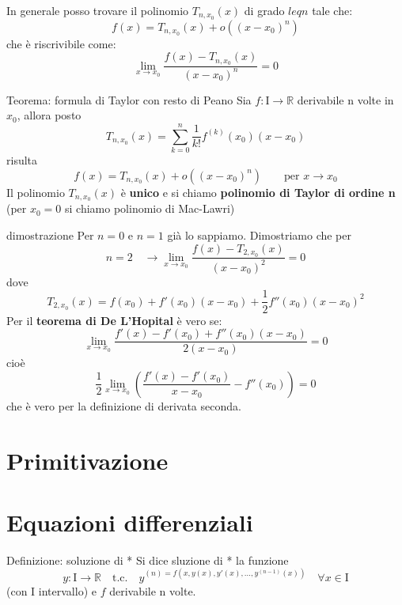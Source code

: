 \documentclass[x11names]{article}
\begin{document}
	In generale posso trovare il polinomio $T_{n,x_0}(x)$ di grado $leq n$ tale che:
	\[
	f(x) = T_{n,x_0}(x) + o\left( (x-x_0)^n\right)
	\]
	che è riscrivibile come:
	\[
	\lim_{x\to x_0}\frac{f(x) - T_{n,x_0}(x)}{(x-x_0)^n} = 0
	\]
	\begin{center}
		\colorbox{myred}{\begin{minipage}{5.75in}
				\begin{redes}{Teorema: formula di Taylor con resto di Peano}
					Sia $f:$I$\to \mathbb{R}$ derivabile n volte in $x_0$, allora posto
					\[
					T_{n,x_0}(x) = \sum_{k=0}^{n}\frac{1}{k!}f^{(k)}(x_0)(x-x_0)
					\]
					risulta
					\[
					f(x) = T_{n,x_0}(x) + o\left( (x-x_0)^n\right) \qquad \text{per }x \to x_0
					\]
					Il polinomio $T_{n,x_0}(x)$ è \textbf{unico} e si chiamo \textbf{polinomio di Taylor di ordine n} (per $x_0 = 0$ si chiamo polinomio di Mac-Lawri)
				\end{redes} 
		\end{minipage}}        
	\end{center}
	\begin{es}{dimostrazione}
		Per $n=0$ e $n=1$ già lo sappiamo. Dimostriamo che per 
		\[
		n = 2 \quad \to \lim_{x\to x_0}\frac{f(x) - T_{2,x_0}(x)}{(x-x_0)^2} = 0
		\]
		dove
		\[
		T_{2,x_0}(x) = f(x_0) + f'(x_0)(x-x_0) + \frac{1}{2}f''(x_0)(x-x_0)^2
		\]
		Per il \textbf{teorema di De L'Hopital} è vero se:
		\[
		\lim_{x\to x_0}\frac{f'(x) - f'(x_0)+f''(x_0)(x-x_0)}{2(x-x_0)} = 0
		\]
		cioè
		\[
		\frac{1}{2}\lim_{x\to x_0}\left( \frac{f'(x) - f'(x_0)}{x-x_0} - f''(x_0)\right) = 0
		\]
		che è vero per la definizione di derivata seconda.
	\end{es}
	
	\newpage
	\section{Primitivazione}
	
	
	\newpage
	\section{Equazioni differenziali}
	
		\begin{center}
		\colorbox{myblue}{\begin{minipage}{5.75in}
				\begin{blues}{Definizione: soluzione di *}
					Si dice sluzione di * la funzione
					\[
					y: \text{I} \to \mathbb{R} \quad \text{t.c.} \quad y^{(n) = f(x,y(x),y'(x),\dots,y^(n-1)(x))} \quad \forall x \in \text{I}
					\]
					(con I intervallo) e $f$ derivabile n volte.
				\end{blues}
		\end{minipage}}       
	\end{center}
	
\end{document}
